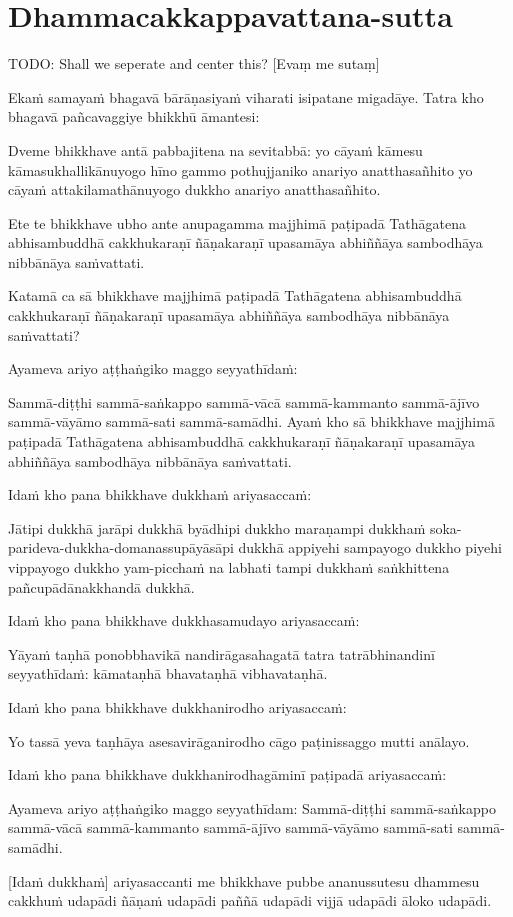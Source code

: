 \section{Dhammacakkappavattana-sutta}

TODO: Shall we seperate and center this?
[Evaṃ me sutaṃ]

Ekaṁ samayaṁ bhagavā bārāṇasiyaṁ viharati isipatane migadāye. Tatra kho bhagavā pañcavaggiye bhikkhū āmantesi:

Dveme bhikkhave antā pabbajitena na sevitabbā: yo cāyaṁ kāmesu kāmasukhallikānuyogo hīno gammo pothujjaniko anariyo anatthasañhito yo cāyaṁ attakilamathānuyogo dukkho anariyo anatthasañhito.

Ete te bhikkhave ubho ante anupagamma majjhimā paṭipadā Tathāgatena abhisambuddhā cakkhukaraṇī ñāṇakaraṇī upasamāya abhiññāya sambodhāya nibbānāya saṁvattati.

Katamā ca sā bhikkhave majjhimā paṭipadā Tathāgatena abhisambuddhā cakkhukaraṇī ñāṇakaraṇī upasamāya abhiññāya sambodhāya nibbānāya saṁvattati?

Ayameva ariyo aṭṭhaṅgiko maggo seyyathīdaṁ:

Sammā-diṭṭhi sammā-saṅkappo sammā-vācā sammā-kammanto sammā-ājīvo sammā-vāyāmo sammā-sati sammā-samādhi.
Ayaṁ kho sā bhikkhave majjhimā paṭipadā Tathāgatena abhisambuddhā cakkhukaraṇī ñāṇakaraṇī upasamāya abhiññāya sambodhāya nibbānāya saṁvattati.

Idaṁ kho pana bhikkhave dukkhaṁ ariyasaccaṁ:

Jātipi dukkhā jarāpi dukkhā byādhipi dukkho maraṇampi dukkhaṁ soka-parideva-dukkha-domanassupāyāsāpi dukkhā appiyehi sampayogo dukkho piyehi vippayogo dukkho yam-picchaṁ na labhati tampi dukkhaṁ saṅkhittena pañcupādānakkhandā dukkhā.

Idaṁ kho pana bhikkhave dukkhasamudayo ariyasaccaṁ:

Yāyaṁ taṇhā ponobbhavikā nandirāgasahagatā tatra tatrābhinandinī seyyathīdaṁ: kāmataṇhā bhavataṇhā vibhavataṇhā.

Idaṁ kho pana bhikkhave dukkhanirodho ariyasaccaṁ:

Yo tassā yeva taṇhāya asesavirāganirodho cāgo paṭinissaggo mutti anālayo.

Idaṁ kho pana bhikkhave dukkhanirodhagāminī paṭipadā ariyasaccaṁ:

Ayameva ariyo aṭṭhaṅgiko maggo seyyathīdam: Sammā-diṭṭhi sammā-saṅkappo sammā-vācā sammā-kammanto sammā-ājīvo sammā-vāyāmo sammā-sati sammā-samādhi.

[Idaṁ dukkhaṁ] ariyasaccanti me bhikkhave pubbe ananussutesu dhammesu cakkhuṁ udapādi ñāṇaṁ udapādi paññā udapādi vijjā udapādi āloko udapādi.

